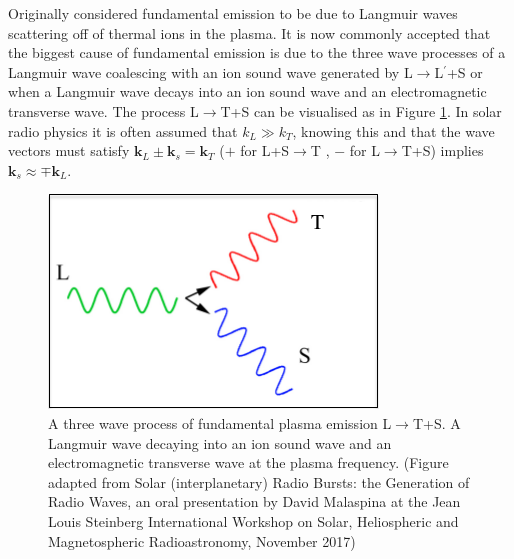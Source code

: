 Originally \cite{Ginzburg1958} considered fundamental emission to be due to Langmuir waves scattering off of thermal ions in the plasma. It is now commonly accepted that the biggest cause of fundamental emission is due to the three wave processes of a Langmuir wave coalescing with an ion sound wave generated by L$\rightarrow$L$^\prime$+S or when a Langmuir wave decays into an ion sound wave and an electromagnetic transverse wave. The process L$\rightarrow$T+S can be visualised as in Figure \ref{fig:Femission}. In solar radio physics it is often assumed that $k_L \gg k_T$, knowing this and that the wave vectors must satisfy $\mathbf{k}_L \pm \mathbf{k}_s = \mathbf{k}_T$ ($+$ for L+S$\rightarrow$T , $-$ for L$\rightarrow$T+S) implies $\mathbf{k}_s \approx \mp \mathbf{k}_L$.

\begin{figure}[ht]
\centering
\includegraphics[width=0.5\columnwidth]{Images/Fundamental_emission_Lwaves.png}
\caption[A three wave process of fundamental plasma emission L$\rightarrow$T+S.]{A three wave process of fundamental plasma emission L$\rightarrow$T+S. A Langmuir wave decaying into an ion sound wave and an electromagnetic transverse wave at the plasma frequency. (Figure adapted from Solar (interplanetary) Radio Bursts: the Generation of Radio Waves,	an oral presentation by David Malaspina at the Jean Louis Steinberg International Workshop on Solar, Heliospheric and Magnetospheric Radioastronomy, November 2017)}
\label{fig:Femission}
\end{figure}

